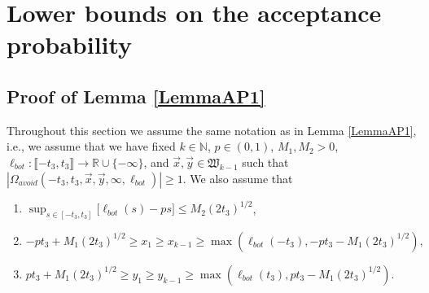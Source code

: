 %
\section{Lower bounds on the acceptance probability}\label{Section6}

\subsection{Proof of Lemma \ref{LemmaAP1}}\label{sect61} Throughout this section we assume the same notation as in Lemma \ref{LemmaAP1}, i.e., we assume that we have fixed $k \in \mathbb{N}$, $p \in (0,1)$, $M_1, M_2 > 0$, $\ell_{bot}: \llbracket -t_3, t_3 \rrbracket \rightarrow \mathbb{R} \cup \{ - \infty \}$, and $\vec{x}, \vec{y} \in \mathfrak{W}_{k-1}$ such that $|\Omega_{avoid}(-t_3, t_3, \vec{x}, \vec{y}, \infty, \ell_{bot})| \geq 1$. We also assume that
\begin{enumerate}
	\item $\sup_{s \in [- t_3,t_3]}\big[\ell_{bot}(s)  - ps \big]  \leq M_2 (2t_3)^{1/2}$,
	\item  $-pt_3 + M_1 (2t_3)^{1/2} \geq  x_1 \geq  x_{k-1} \geq \max\left(\ell_{bot}(-t_3), -pt_3 - M_1 (2t_3)^{1/2}\right),$
	\item $pt_3 + M_1 (2t_3)^{1/2} \geq y_1 \geq y_{k-1} \geq  \max \left( \ell_{bot}(t_3),  p t_3 - M_1(2t_3)^{1/2} \right).$
\end{enumerate}

